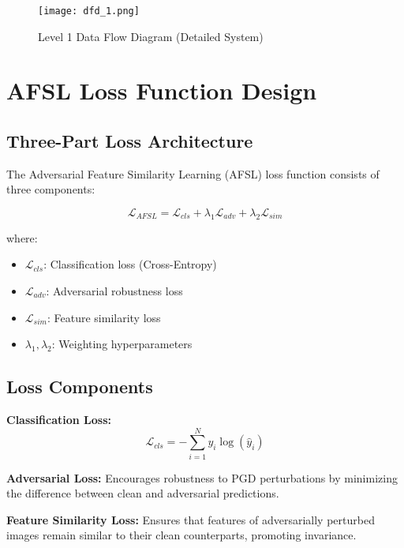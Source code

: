 \documentclass[a4paper,12pt]{article}
\begin{document}
\begin{figure}[h]
    \centering
     \texttt{[image: dfd\_1.png]}
    \fb
    \caption{Level 1 Data Flow Diagram (Detailed System)}
    \label{fig:dfd1}
\end{figure}

\clearpage

\section{AFSL Loss Function Design}

\subsection{Three-Part Loss Architecture}
The Adversarial Feature Similarity Learning (AFSL) loss function consists of three components:

\begin{equation}
\mathcal{L}_{AFSL} = \mathcal{L}_{cls} + \lambda_1 \mathcal{L}_{adv} + \lambda_2 \mathcal{L}_{sim}
\end{equation}

where:
\begin{itemize}
    \item $\mathcal{L}_{cls}$: Classification loss (Cross-Entropy)
    \item $\mathcal{L}_{adv}$: Adversarial robustness loss
    \item $\mathcal{L}_{sim}$: Feature similarity loss
    \item $\lambda_1, \lambda_2$: Weighting hyperparameters
\end{itemize}

\subsection{Loss Components}

\textbf{Classification Loss:}
\begin{equation}
\mathcal{L}_{cls} = -\sum_{i=1}^{N} y_i \log(\hat{y}_i)
\end{equation}

\textbf{Adversarial Loss:}
Encourages robustness to PGD perturbations by minimizing the difference between clean and adversarial predictions.

\textbf{Feature Similarity Loss:}
Ensures that features of adversarially perturbed images remain similar to their clean counterparts, promoting invariance.
\end{document}
